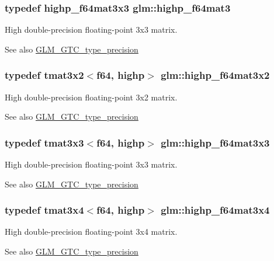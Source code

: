 \subsubsection[{highp\+\_\+f64mat3}]{\setlength{\rightskip}{0pt plus 5cm}typedef {\bf highp\+\_\+f64mat3x3} {\bf glm\+::highp\+\_\+f64mat3}}\label{namespaceglm_a00c5743b0eba6b437422571f4eda27b8}
High double-\/precision floating-\/point 3x3 matrix. \begin{DoxySeeAlso}{See also}
\hyperlink{group__gtc__type__precision}{G\+L\+M\+\_\+\+G\+T\+C\+\_\+type\+\_\+precision} 
\end{DoxySeeAlso}
\hypertarget{namespaceglm_a7593188af43cdd18e62f77b02d060b18}{}
\subsubsection[{highp\+\_\+f64mat3x2}]{\setlength{\rightskip}{0pt plus 5cm}typedef tmat3x2$<${\bf f64}, highp$>$ {\bf glm\+::highp\+\_\+f64mat3x2}}\label{namespaceglm_a7593188af43cdd18e62f77b02d060b18}
High double-\/precision floating-\/point 3x2 matrix. \begin{DoxySeeAlso}{See also}
\hyperlink{group__gtc__type__precision}{G\+L\+M\+\_\+\+G\+T\+C\+\_\+type\+\_\+precision} 
\end{DoxySeeAlso}
\hypertarget{namespaceglm_a6fec5193d73c03188d068d07801feef6}{}
\subsubsection[{highp\+\_\+f64mat3x3}]{\setlength{\rightskip}{0pt plus 5cm}typedef tmat3x3$<${\bf f64}, highp$>$ {\bf glm\+::highp\+\_\+f64mat3x3}}\label{namespaceglm_a6fec5193d73c03188d068d07801feef6}
High double-\/precision floating-\/point 3x3 matrix. \begin{DoxySeeAlso}{See also}
\hyperlink{group__gtc__type__precision}{G\+L\+M\+\_\+\+G\+T\+C\+\_\+type\+\_\+precision} 
\end{DoxySeeAlso}
\hypertarget{namespaceglm_ad2c12ef873498ae6631f18bf2a33f8eb}{}
\subsubsection[{highp\+\_\+f64mat3x4}]{\setlength{\rightskip}{0pt plus 5cm}typedef tmat3x4$<${\bf f64}, highp$>$ {\bf glm\+::highp\+\_\+f64mat3x4}}\label{namespaceglm_ad2c12ef873498ae6631f18bf2a33f8eb}
High double-\/precision floating-\/point 3x4 matrix. \begin{DoxySeeAlso}{See also}
\hyperlink{group__gtc__type__precision}{G\+L\+M\+\_\+\+G\+T\+C\+\_\+type\+\_\+precision} 
\end{DoxySeeAlso}
\hypertarget{namespaceglm_a1ac5d0564721a22765c68c54a0a4f87a}{}
